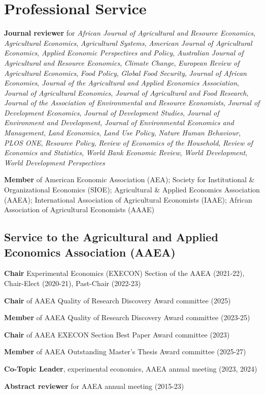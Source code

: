 \documentclass[letterpaper]{article}
\renewenvironment{itemize}{
  \begin{list}
  	{}{
    \setlength{\leftmargin}{1.5em}
    \setlength{\itemsep}{-.5em}
  }
}{
  \end{list}
}
\begin{document}
\section*{\sc Professional Service}
\begin{itemize}
\item \textbf{Journal reviewer} for \emph{African Journal of Agricultural and Resource Economics}, \emph{Agricultural Economics}, \emph{Agricultural Systems}, \emph{American Journal of Agricultural Economics}, \emph{Applied Economic Perspectives and Policy}, \emph{Australian Journal of Agricultural and Resource Economics}, \emph{Climate Change}, \emph{European Review of Agricultural Economics}, \emph{Food Policy}, \emph{Global Food Security}, \emph{Journal of African Economies}, \emph{Journal of the Agricultural and Applied Economics Association}, \emph{Journal of Agricultural Economics}, \emph{Journal of Agricultural and Food Research}, \emph{Journal of the Association of Environmental and Resource Economists}, \emph{Journal of Development Economics}, \emph{Journal of Development Studies}, \emph{Journal of Environment and Development}, \emph{Journal of Environmental Economics and Management}, \emph{Land Economics}, \emph{Land Use Policy}, \emph{Nature Human Behaviour}, \emph{PLOS ONE}, \emph{Resource Policy}, \emph{Review of Economics of the Household}, \emph{Review of Economics and Statistics}, \emph{World Bank Economic Review}, \emph{World Development}, \emph{World Development Perspectives}
\item \textbf{Member} of American Economic Association (AEA); Society for Institutional \& Organizational Economics (SIOE); Agricultural \& Applied Economics Association (AAEA); International Association of Agricultural Economists (IAAE); African Association of Agricultural Economists (AAAE)
\end{itemize}

\subsection*{Service to the Agricultural and Applied Economics Association (AAEA)}
\begin{itemize}
\item \textbf{Chair} Experimental Economics (EXECON) Section of the AAEA (2021-22), Chair-Elect (2020-21), Past-Chair (2022-23)
\item \textbf{Chair} of AAEA Quality of Research Discovery Award committee (2025)
\item \textbf{Member} of AAEA Quality of Research Discovery Award committee (2023-25)
\item \textbf{Chair} of AAEA EXECON Section Best Paper Award committee (2023)
\item \textbf{Member} of AAEA Outstanding Master's Thesis Award committee (2025-27)
\item \textbf{Co-Topic Leader}, experimental economics, AAEA annual meeting (2023, 2024)
\item \textbf{Abstract reviewer} for AAEA annual meeting (2015-23)
\end{itemize}
\end{document}
